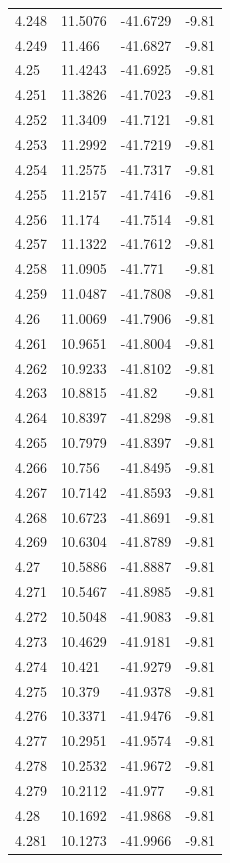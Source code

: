 \begin{tabular}{llll}
4.248 & 11.5076 & -41.6729 & -9.81 \\
4.249 & 11.466 & -41.6827 & -9.81 \\
4.25 & 11.4243 & -41.6925 & -9.81 \\
4.251 & 11.3826 & -41.7023 & -9.81 \\
4.252 & 11.3409 & -41.7121 & -9.81 \\
4.253 & 11.2992 & -41.7219 & -9.81 \\
4.254 & 11.2575 & -41.7317 & -9.81 \\
4.255 & 11.2157 & -41.7416 & -9.81 \\
4.256 & 11.174 & -41.7514 & -9.81 \\
4.257 & 11.1322 & -41.7612 & -9.81 \\
4.258 & 11.0905 & -41.771 & -9.81 \\
4.259 & 11.0487 & -41.7808 & -9.81 \\
4.26 & 11.0069 & -41.7906 & -9.81 \\
4.261 & 10.9651 & -41.8004 & -9.81 \\
4.262 & 10.9233 & -41.8102 & -9.81 \\
4.263 & 10.8815 & -41.82 & -9.81 \\
4.264 & 10.8397 & -41.8298 & -9.81 \\
4.265 & 10.7979 & -41.8397 & -9.81 \\
4.266 & 10.756 & -41.8495 & -9.81 \\
4.267 & 10.7142 & -41.8593 & -9.81 \\
4.268 & 10.6723 & -41.8691 & -9.81 \\
4.269 & 10.6304 & -41.8789 & -9.81 \\
4.27 & 10.5886 & -41.8887 & -9.81 \\
4.271 & 10.5467 & -41.8985 & -9.81 \\
4.272 & 10.5048 & -41.9083 & -9.81 \\
4.273 & 10.4629 & -41.9181 & -9.81 \\
4.274 & 10.421 & -41.9279 & -9.81 \\
4.275 & 10.379 & -41.9378 & -9.81 \\
4.276 & 10.3371 & -41.9476 & -9.81 \\
4.277 & 10.2951 & -41.9574 & -9.81 \\
4.278 & 10.2532 & -41.9672 & -9.81 \\
4.279 & 10.2112 & -41.977 & -9.81 \\
4.28 & 10.1692 & -41.9868 & -9.81 \\
4.281 & 10.1273 & -41.9966 & -9.81 \\

\end{tabular}
